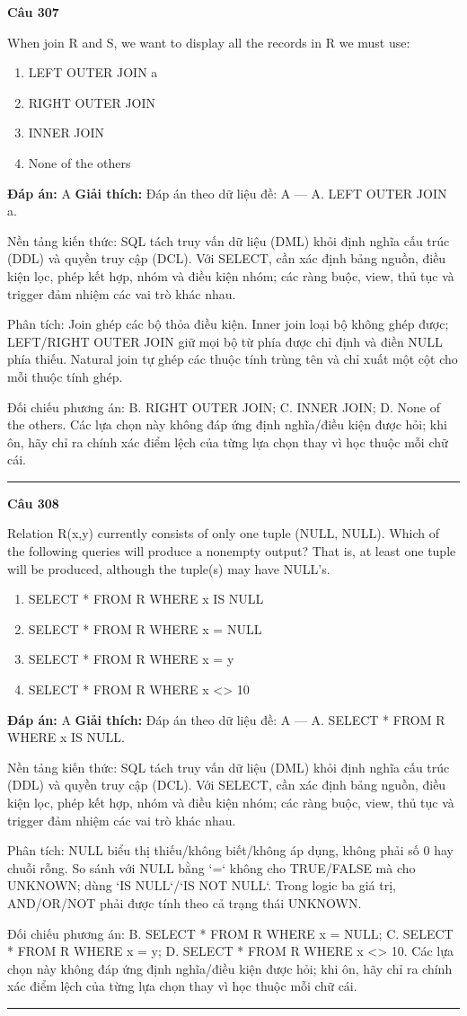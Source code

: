 \documentclass[11pt,a4paper]{article}
\newenvironment{question}[1]{%
  \par\vspace{1em}\noindent\textbf{\large Câu #1}\par\vspace{0.4em}
}{%
  \par\vspace{1em}\hrule\vspace{0.6em}
}
\newenvironment{choices}{%
  \begin{enumerate}[label=\textbf{\Alph*.},leftmargin=2.2em,itemsep=2pt,topsep=3pt]
}{%
  \end{enumerate}
}
\newcommand{\choice}{\item}
\begin{document}
\begin{question}{307}
When join R and S, we want to display all the records in R we must use:
\begin{choices}
\choice LEFT OUTER JOIN a
\choice RIGHT OUTER JOIN
\choice INNER JOIN
\choice None of the others
\end{choices}
\textbf{Đáp án:} A
\textbf{Giải thích:} Đáp án theo dữ liệu đề: A — A. LEFT OUTER JOIN a.

Nền tảng kiến thức: SQL tách truy vấn dữ liệu (DML) khỏi định nghĩa cấu trúc (DDL) và quyền truy cập (DCL). Với SELECT, cần xác định bảng nguồn, điều kiện lọc, phép kết hợp, nhóm và điều kiện nhóm; các ràng buộc, view, thủ tục và trigger đảm nhiệm các vai trò khác nhau.

Phân tích: Join ghép các bộ thỏa điều kiện. Inner join loại bộ không ghép được; LEFT/RIGHT OUTER JOIN giữ mọi bộ từ phía được chỉ định và điền NULL phía thiếu. Natural join tự ghép các thuộc tính trùng tên và chỉ xuất một cột cho mỗi thuộc tính ghép.

Đối chiếu phương án: B. RIGHT OUTER JOIN; C. INNER JOIN; D. None of the others. Các lựa chọn này không đáp ứng định nghĩa/điều kiện được hỏi; khi ôn, hãy chỉ ra chính xác điểm lệch của từng lựa chọn thay vì học thuộc mỗi chữ cái.
\end{question}

\begin{question}{308}
Relation R(x,y) currently consists of only one tuple (NULL, NULL). Which of the following queries will produce a nonempty output? That is, at least one tuple will be produced, although the tuple(s) may have NULL's.
\begin{choices}
\choice SELECT * FROM R WHERE x IS NULL
\choice SELECT * FROM R WHERE x = NULL
\choice SELECT * FROM R WHERE x = y
\choice SELECT * FROM R WHERE x <> 10
\end{choices}
\textbf{Đáp án:} A
\textbf{Giải thích:} Đáp án theo dữ liệu đề: A — A. SELECT * FROM R WHERE x IS NULL.

Nền tảng kiến thức: SQL tách truy vấn dữ liệu (DML) khỏi định nghĩa cấu trúc (DDL) và quyền truy cập (DCL). Với SELECT, cần xác định bảng nguồn, điều kiện lọc, phép kết hợp, nhóm và điều kiện nhóm; các ràng buộc, view, thủ tục và trigger đảm nhiệm các vai trò khác nhau.

Phân tích: NULL biểu thị thiếu/không biết/không áp dụng, không phải số 0 hay chuỗi rỗng. So sánh với NULL bằng `=` không cho TRUE/FALSE mà cho UNKNOWN; dùng `IS NULL`/`IS NOT NULL`. Trong logic ba giá trị, AND/OR/NOT phải được tính theo cả trạng thái UNKNOWN.

Đối chiếu phương án: B. SELECT * FROM R WHERE x = NULL; C. SELECT * FROM R WHERE x = y; D. SELECT * FROM R WHERE x <> 10. Các lựa chọn này không đáp ứng định nghĩa/điều kiện được hỏi; khi ôn, hãy chỉ ra chính xác điểm lệch của từng lựa chọn thay vì học thuộc mỗi chữ cái.
\end{question}
\end{document}
